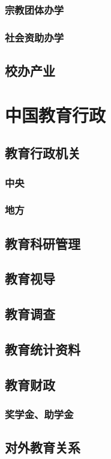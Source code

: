 \documentclass[UTF8]{../../ApplicationUniverse}
\begin{document}
        \subsubsection{宗教团体办学}
        \subsubsection{社会资助办学}
    \subsection{校办产业}

\section{中国教育行政}
    \subsection{教育行政机关}
        \subsubsection{中央}
        \subsubsection{地方}
    \subsection{教育科研管理}
    \subsection{教育视导}
    \subsection{教育调查}
    \subsection{教育统计资料}
    \subsection{教育财政}
        \subsubsection{奖学金、助学金}
    \subsection{对外教育关系}
\end{document}

